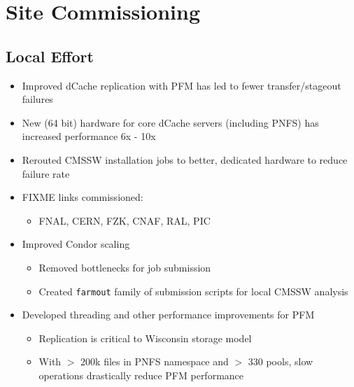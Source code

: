 \documentclass{beamer}
\begin{document}
\section{Site Commissioning}
\subsection{Local Effort}
\begin{frame}
\begin{itemize}
    \item Improved dCache replication with PFM has led to fewer transfer/stageout failures
    \item New (64 bit) hardware for core dCache servers (including PNFS) has increased performance 6x - 10x
    \item Rerouted CMSSW installation jobs to better, dedicated hardware to reduce failure rate
    \item FIXME links commissioned:
    \begin{itemize}
        \item FNAL, CERN, FZK, CNAF, RAL, PIC
    \end{itemize}
    \item Improved Condor scaling
    \begin{itemize}
        \item Removed bottlenecks for job submission
        \item Created {\tt farmout} family of submission scripts for local CMSSW analysis
    \end{itemize}
    \item Developed threading and other performance improvements for PFM
    \begin{itemize}
        \item Replication is critical to Wisconsin storage model
        \item With $>$ 200k files in PNFS namespace and $>$ 330 pools, slow operations drastically reduce PFM performance
    \end{itemize}
\end{itemize}
\end{frame}
\end{document}
